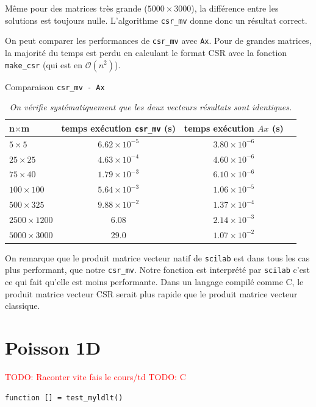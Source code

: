 \documentclass{article}
\begin{document}
Même pour des matrices très grande (\(5000\times3000\)), la différence entre les solutions est toujours nulle. L'algorithme \texttt{csr\_mv} donne donc un résultat correct.

On peut comparer les performances de \texttt{csr\_mv} avec \texttt{Ax}. Pour de grandes matrices, la majorité du temps est perdu en calculant le format CSR avec la fonction \texttt{make\_csr} (qui est en \(\mathcal{O}(n^2)\)). 

\begin{table}[H]
\centering
\caption{Comparaison \texttt{csr\_mv - Ax}}
\renewcommand*\arraystretch{1.3}
\begin{tabular}{|l|c|c|c|}
  \hline
  n\(\times\)m & temps exécution \texttt{csr\_mv} (s) & temps exécution \(Ax\) (s) \\
  \hline
	\(5 \times 5\)		&	\(6.62 \times 10^{-5}\)	&	\(3.80 \times 10^{-6}\)	\\
	\(25 \times 25\)	&	\(4.63 \times 10^{-4}\)	&	\(4.60 \times 10^{-6}\)	\\
	\(75 \times 40\)	&	\(1.79 \times 10^{-3}\)	&	\(6.10 \times 10^{-6}\)	\\
	\(100 \times 100\)	&	\(5.64 \times 10^{-3}\)	&	\(1.06 \times 10^{-5}\)	\\
	\(500 \times 325\)	&	\(9.88 \times 10^{-2}\)	&	\(1.37 \times 10^{-4}\)	\\
	\(2500 \times 1200\)&	6.08					&	\(2.14 \times 10^{-3}\)	\\
	\(5000 \times 3000\)&	29.0					&	\(1.07 \times 10^{-2}\)	\\
  \hline
\end{tabular}
\caption*{\textit{On vérifie systématiquement que les deux vecteurs résultats sont identiques.}}
\end{table}

On remarque que le produit matrice vecteur natif de \texttt{scilab} est dans tous les cas plus performant, que notre \texttt{csr\_mv}. Notre fonction est interprété par \texttt{scilab} c'est ce qui fait qu'elle est moins performante. Dans un langage compilé comme C, le produit matrice vecteur CSR serait plus rapide que le produit matrice vecteur classique.

\section{Poisson 1D}

\textcolor{red}{TODO: Raconter vite fais le cours/td}
\textcolor{red}{TODO: C}

\begin{verbatim}
function [] = test_myldlt()
\end{verbatim}
\end{document}
